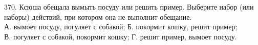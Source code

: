 370. Ксюша обещала вымыть посуду или решить пример. Выберите набор (или наборы) действий, при котором она не выполнит обещание.\\
А. вымоет посуду, погуляет с собакой;  \qquad \quad Б. покормит кошку, решит пример;\\
В. погуляет с собакой, покормит кошку; \qquad  Г. решит пример, вымоет посуду.\\
